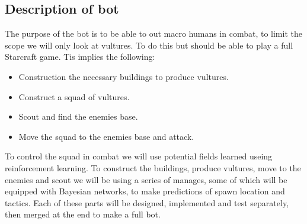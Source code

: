 \subsection*{Description of bot}
	The purpose of the bot is to be able to out macro humans in combat, to limit the scope we will only look at vultures. 
	To do this but should be able to play a full Starcraft game. Tis implies the following:
	\begin{itemize}
		\item Construction the necessary buildings to produce vultures.
		\item Construct a squad of vultures.
		\item Scout and find the enemies base.
		\item Move the squad to the enemies base and attack.
	\end{itemize}
	
	To control the squad in combat we will use potential fields learned useing reinforcement learning.
	To construct the buildings, produce vultures, move to the enemies and scout we will be using a series of manages, some of which will be equipped with Bayesian networks, to make predictions of spawn location and tactics.
	Each of these parts will be designed, implemented and test separately, then merged at the end to make a full bot.